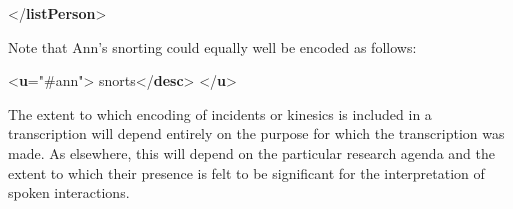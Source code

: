 \begin{shaded}
{</\textbf{listPerson}>}\end{shaded}\egroup\par \noindent  Note that Ann's snorting could equally well be encoded as follows: \par\bgroup{}\exampleFont \begin{shaded}\noindent\mbox{}{<\textbf{u}\hspace*{1em}{who}="{\#ann}">}\mbox{}\newline 
{}\mbox{}\newline 
\hspace*{1em}snorts{</\textbf{desc}>}\mbox{}\newline 
{}\mbox{}\newline 
{</\textbf{u}>}\end{shaded}\egroup\par \par
The extent to which encoding of incidents or kinesics is included in a transcription will depend entirely on the purpose for which the transcription was made. As elsewhere, this will depend on the particular research agenda and the extent to which their presence is felt to be significant for the interpretation of spoken interactions. 
